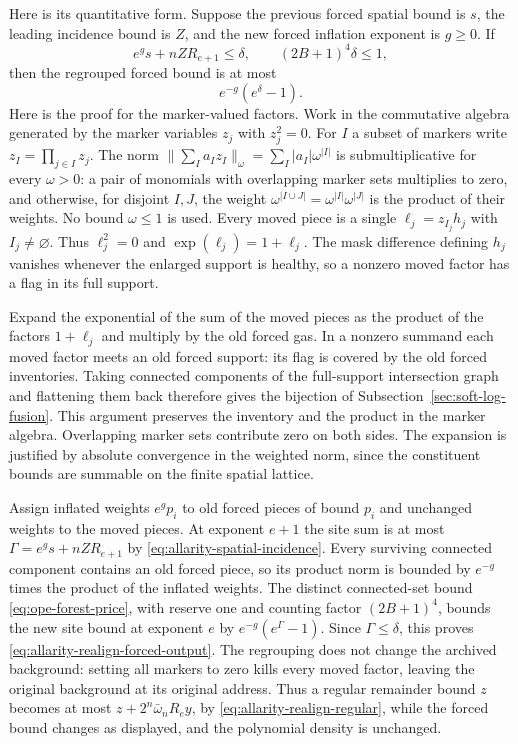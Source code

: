 Here is its quantitative form. Suppose the previous forced spatial
bound is $s$, the leading incidence bound is $Z$, and the new forced
inflation exponent is $g\ge0$. If
\begin{equation}\label{eq:allarity-realign-forced-input}
 e^g s+n Z R_{e+1}\le\delta,
           \qquad (2B+1)^4\delta\le1,
\end{equation}
then the regrouped forced bound is at most
\begin{equation}\label{eq:allarity-realign-forced-output}
                           e^{-g}(e^\delta-1).
\end{equation}
Here is the proof for the marker-valued factors. Work in the
commutative algebra generated by the marker variables $z_j$ with
$z_j^2=0$. For $I$ a subset of markers write $z_I=\prod_{j\in I}z_j$.
The norm $\|\sum_I a_I z_I\|_\omega=\sum_I |a_I|\omega^{|I|}$ is
submultiplicative for every $\omega>0$: a pair of monomials with
overlapping marker sets multiplies to zero, and otherwise, for
disjoint $I,J$, the weight $\omega^{|I\cup J|}=\omega^{|I|}\omega^{|J|}$
is the product of their weights. No bound $\omega\le1$ is used. Every moved piece is a single $\ell_j=z_{I_j}h_j$ with
$I_j\ne\varnothing$. Thus $\ell_j^2=0$ and $\exp(\ell_j)=1+\ell_j$.
The mask difference defining $h_j$ vanishes whenever the enlarged
support is healthy, so a nonzero moved factor has a flag in its full
support.

Expand the exponential of the sum of the moved pieces as the product
of the factors $1+\ell_j$ and multiply by the old forced gas. In a
nonzero summand each moved factor meets an old forced support: its flag
is covered by the old forced inventories. Taking connected components
of the full-support intersection graph and flattening them back
therefore gives the bijection of
Subsection~\ref{sec:soft-log-fusion}. This argument preserves the
inventory and the product in the marker algebra. Overlapping marker
sets contribute zero on both sides. The expansion is justified by
absolute convergence in the weighted norm, since the constituent
bounds are summable on the finite spatial lattice.

Assign inflated weights $e^g p_i$ to old forced pieces of bound $p_i$
and unchanged weights to the moved pieces. At exponent $e+1$ the
site sum is at most $\Gamma=e^g s+nZR_{e+1}$ by
\eqref{eq:allarity-spatial-incidence}. Every surviving connected
component contains an old forced piece, so its product norm is
bounded by $e^{-g}$ times the product of the inflated weights.
The distinct connected-set bound \eqref{eq:ope-forest-price},
with reserve one and counting factor $(2B+1)^4$, bounds the new
site bound at exponent $e$ by $e^{-g}(e^\Gamma-1)$.
Since $\Gamma\le\delta$, this proves
\eqref{eq:allarity-realign-forced-output}. The regrouping does not
change the archived background: setting all markers to zero kills
every moved factor, leaving the original background at its original
address.
Thus a regular remainder bound $z$ becomes at most
$z+2^n\bar\omega_nR_e y$, by \eqref{eq:allarity-realign-regular},
while the forced bound changes as displayed, and the polynomial
density is unchanged.

